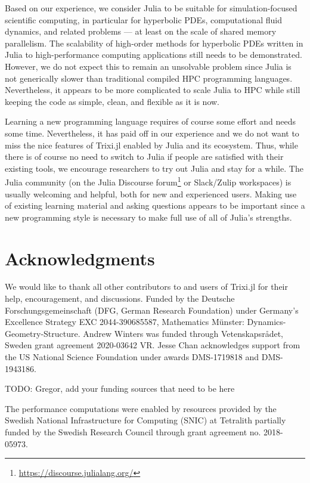 \documentclass{juliacon}
\newcommand{\trixi}{Trixi.jl\xspace}
\newcommand{\todo}[1]{{\color{red}#1}}
\begin{document}
Based on our experience, we consider Julia to be suitable for simulation-focused
scientific computing, in particular for hyperbolic PDEs, computational fluid
dynamics, and related problems --- at least on the scale of shared memory
parallelism. The scalability of high-order methods for hyperbolic PDEs written
in Julia to high-performance computing applications still needs to be demonstrated.
However, we do not expect this to remain an unsolvable problem since Julia is not 
generically slower than traditional compiled HPC programming languages. Nevertheless, 
it appears to be more complicated to scale Julia to HPC while still keeping the
code as simple, clean, and flexible as it is now.

Learning a new programming language requires of course some effort and needs some
time. Nevertheless, it has paid off in our experience and we do not want to miss the
nice features of \trixi enabled by Julia and its ecosystem. Thus, while there is
of course no need to switch to Julia if people are satisfied with their existing
tools, we encourage researchers to try out Julia and stay for a while. The Julia
community (on the Julia Discourse forum\footnote{\url{https://discourse.julialang.org/}}
or Slack/Zulip workspaces) is usually welcoming and helpful, both for new and
experienced users. Making use of existing learning material and asking questions
appears to be important since a new programming style is necessary to make full
use of all of Julia's strengths.



\section*{Acknowledgments}

We would like to thank all other contributors to and users of \trixi for their
help, encouragement, and discussions.
Funded by the Deutsche Forschungsgemeinschaft (DFG, German Research Foundation)
under Germany's Excellence Strategy EXC 2044-390685587, Mathematics Münster:
Dynamics-Geometry-Structure.
Andrew Winters was funded through Vetenskapsr{\aa}det, Sweden grant
agreement 2020-03642 VR.
Jesse Chan acknowledges support from the US National Science Foundation under
awards DMS-1719818 and DMS-1943186.

\todo{TODO: Gregor, add your funding sources that need to be here} %

The performance computations were enabled by resources provided by the Swedish National
Infrastructure for Computing (SNIC) at Tetralith partially funded by the Swedish
Research Council through grant agreement no. 2018-05973.
\end{document}
